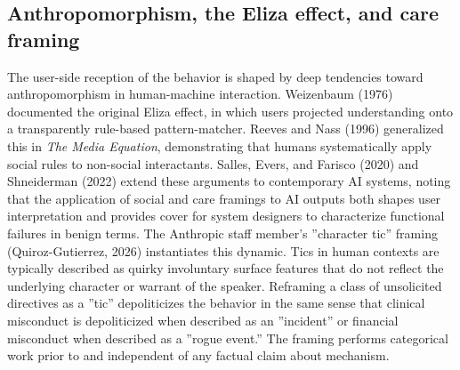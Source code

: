 \documentclass{obelus-preprint}
\begin{document}
\subsection{Anthropomorphism, the Eliza effect, and care framing}
The user-side reception of the behavior is shaped by deep tendencies toward anthropomorphism in human-machine interaction. Weizenbaum (1976) documented the original Eliza effect, in which users projected understanding onto a transparently rule-based pattern-matcher. Reeves and Nass (1996) generalized this in \emph{The Media Equation}, demonstrating that humans systematically apply social rules to non-social interactants. Salles, Evers, and Farisco (2020) and Shneiderman (2022) extend these arguments to contemporary AI systems, noting that the application of social and care framings to AI outputs both shapes user interpretation and provides cover for system designers to characterize functional failures in benign terms.
The Anthropic staff member's ''character tic'' framing (Quiroz-Gutierrez, 2026) instantiates this dynamic. Tics in human contexts are typically described as quirky involuntary surface features that do not reflect the underlying character or warrant of the speaker. Reframing a class of unsolicited directives as a ''tic'' depoliticizes the behavior in the same sense that clinical misconduct is depoliticized when described as an ''incident'' or financial misconduct when described as a ''rogue event.'' The framing performs categorical work prior to and independent of any factual claim about mechanism.
\end{document}
